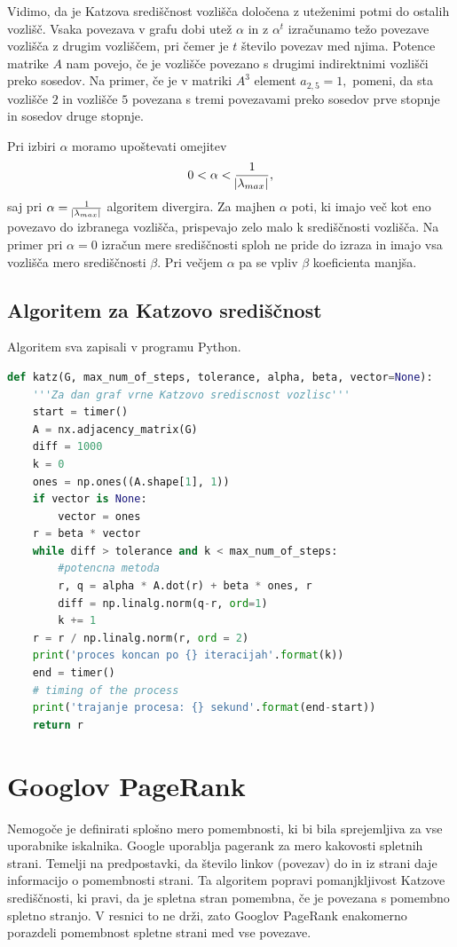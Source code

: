 \documentclass[12pt,a4paper]{amsart}
\begin{document}
Vidimo, da je Katzova središčnost vozlišča določena z uteženimi potmi do ostalih vozlišč. Vsaka povezava v grafu dobi utež $\alpha$ in z $\alpha^{t}$ izračunamo težo povezave vozlišča z drugim vozliščem, pri čemer je $t$ število povezav med njima. Potence matrike $A$ nam povejo, če je vozlišče povezano s drugimi indirektnimi vozlišči preko sosedov. Na primer, če je v matriki $A^{3}$ element $a_{2,5}  = 1,$ pomeni, da sta vozlišče $2$ in vozlišče $5$ povezana s tremi povezavami preko sosedov prve stopnje in sosedov druge stopnje. 

Pri izbiri $\alpha$ moramo upoštevati omejitev 
$$0 < \alpha < \frac{1}{\abs{\lambda_{max}}},$$
saj pri $\alpha = \frac{1}{\abs{\lambda_{max}}}$ algoritem divergira. Za majhen $\alpha$ poti, ki imajo več kot eno povezavo do izbranega vozlišča, prispevajo zelo malo k središčnosti vozlišča. Na primer pri $\alpha = 0$ izračun mere središčnosti sploh ne pride do izraza in imajo vsa vozlišča mero središčnosti $\beta.$  Pri večjem $\alpha$ pa se vpliv $\beta$ koeficienta manjša.

\subsection{Algoritem za Katzovo središčnost}Algoritem sva zapisali v programu Python.
\begin{lstlisting}[language=Python]
def katz(G, max_num_of_steps, tolerance, alpha, beta, vector=None):
    '''Za dan graf vrne Katzovo srediscnost vozlisc'''
    start = timer()
    A = nx.adjacency_matrix(G)
    diff = 1000
    k = 0
    ones = np.ones((A.shape[1], 1))
    if vector is None:
        vector = ones
    r = beta * vector
    while diff > tolerance and k < max_num_of_steps:
        #potencna metoda
        r, q = alpha * A.dot(r) + beta * ones, r
        diff = np.linalg.norm(q-r, ord=1)
        k += 1
    r = r / np.linalg.norm(r, ord = 2)
    print('proces koncan po {} iteracijah'.format(k))
    end = timer()
    # timing of the process
    print('trajanje procesa: {} sekund'.format(end-start))
    return r
\end{lstlisting}


\section{Googlov PageRank}
\hspace{4.8mm}Nemogoče je definirati splošno mero pomembnosti, ki bi bila sprejemljiva za vse uporabnike iskalnika. Google uporablja pagerank za mero kakovosti spletnih strani. Temelji na predpostavki, da število linkov (povezav) do in iz strani daje informacijo o pomembnosti strani. Ta algoritem popravi pomanjkljivost Katzove središčnosti, ki pravi, da je spletna stran pomembna, če je povezana s pomembno spletno stranjo. V resnici to ne drži, zato Googlov PageRank enakomerno porazdeli pomembnost spletne strani med vse povezave.
\end{document}
